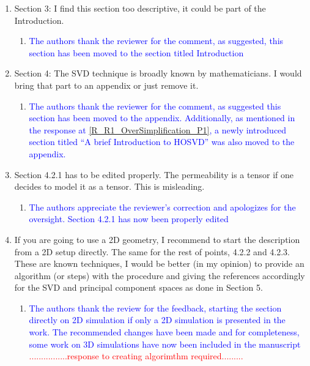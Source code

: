 \documentclass[11pt]{letter} %
\newcommand{\red}{\textcolor{red}}
\newcommand{\blue}{\textcolor{blue}}
\begin{document}
\begin{letter}
{\begin{enumerate}
\begin{enumerate}
\begin{enumerate}
      \item \label{R_R2_NumFormulation_1} \blue{..........}
        \end{enumerate}
\item \label{R_R2_TooDesc} Section 3: I find this section too descriptive, it could be part of the Introduction.
 \begin{enumerate}
      \item \label{R_R2_TooDesc_1} \blue{The authors thank the reviewer for the comment, as suggested, this section has been moved to the section titled Introduction}
    \end{enumerate}
\item \label{R_R2_SVDWellKnown} Section 4: The SVD technique is broadly known by mathematicians. I would bring that part to an appendix or just remove it.
  \begin{enumerate}
      \item \label{R_R2_SVDWellKnown_1} \blue{The authors thank the reviewer for the comment, as suggested this section has been moved to the appendix. Additionally, as mentioned in the response at \ref{R_R1_OverSimplification_P1}, a newly introduced section titled ``A brief Introduction to HOSVD'' was also moved to the appendix.}
        \end{enumerate}
\item \label{R_R2_TensorCorrection}Section 4.2.1 has to be edited properly. The permeability is a tensor if one decides to model it as a tensor. This is misleading.
  \begin{enumerate}
      \item \label{R_R2_TensorCorrection_1} \blue{The authors appreciate the reviewer's correction and apologizes for the oversight. Section 4.2.1 has now been properly edited}
        \end{enumerate}
  \item \label{R_R2_GeomSetupAlgorithm} If you are going to use a 2D geometry, I recommend to start the description from a 2D setup directly. The same for the rest of points, 4.2.2 and 4.2.3. These are known techniques, I would be better (in my opinion) to provide an algorithm (or steps) with the procedure and giving the references accordingly for the SVD and principal component spaces as done in Section 5.
 \begin{enumerate}
      \item \label{R_R2_GeomSetupAlgorithm_1} \blue{The authors thank the review for the feedback, starting the section directly on 2D simulation if only a 2D simulation is presented in the work. The recommended changes have been made and for completeness, some work on 3D simulations have now been included in the manuscript} \red{................response to creating algorimthm required.........}
        \end{enumerate}
\end{enumerate}
\end{enumerate}
}


\end{letter}
\end{document}
